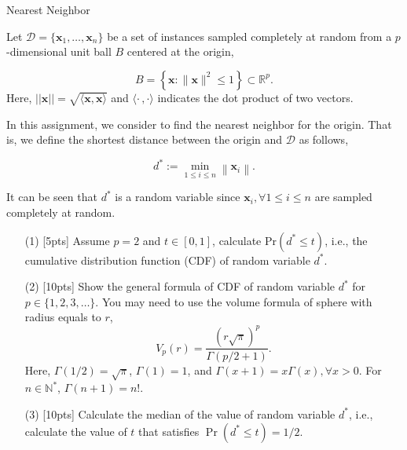 \documentclass[11pt, a4paper, UTF8]{ctexart}
\begin{document}
\begin{problem}[ML problem 3]
[25pts] {Nearest Neighbor}
	
Let $\mathcal{D} = \{\mathbf{x}_1, \dots, \mathbf{x}_n\}$ be a set of instances sampled completely at random from a $p$-dimensional unit ball $B$ centered at the origin,

\begin{equation}
B=\left\{\mathbf{x} :\|\mathbf{x}\|^{2} \leq 1\right\} \subset \mathbb{R}^{p}.
\end{equation}
Here, $||\mathbf{x}|| = \sqrt{\langle \mathbf{x}, \mathbf{x}\rangle}$ and $\langle \cdot \,, \cdot \rangle$ indicates the dot product of two vectors.

In this assignment, we consider to find the nearest neighbor for the origin. That is, we define the shortest distance between the origin and $\mathcal{D}$ as follows,

\begin{equation}
d^{*} :=\min _{1 \leq i \leq n}\left\|\mathbf{x}_{i}\right\|.
\end{equation}

It can be seen that $d^*$ is a random variable since $\mathbf{x}_i, \forall 1 \leq i \leq n$ are sampled completely at random.	

\begin{enumerate}
	\item [(1)] [5pts] Assume $ p = 2 $ and $ t \in [0, 1]$, calculate Pr$(d^* \leq t)$, i.e., the cumulative distribution function (CDF) of random variable $d^*$.
	\item [(2)] [10pts] Show the general formula of CDF of random variable $d^*$ for $p \in \{1, 2, 3, \dots \}$. You may need to use the volume formula of sphere with radius equals to $r$,
	\begin{equation}
	V_{p}(r)=\frac{(r \sqrt{\pi})^{p}}{\Gamma(p / 2+1)}.
	\end{equation}
	Here, $\Gamma(1 / 2)=\sqrt{\pi}$, $\Gamma(1)=1$, and $\Gamma(x+1)=x \Gamma(x), \forall x > 0$. For $n \in \mathbb{N}^*$, $\Gamma(n+1)=n!$.
	\item [(3)] [10pts] Calculate the median of the value of random variable $d^*$, i.e., calculate the value of $t$ that satisfies $\operatorname{Pr}\left(d^{*} \leq t\right)=1 / 2$.
\end{enumerate}
	
\end{problem}
\end{document}
